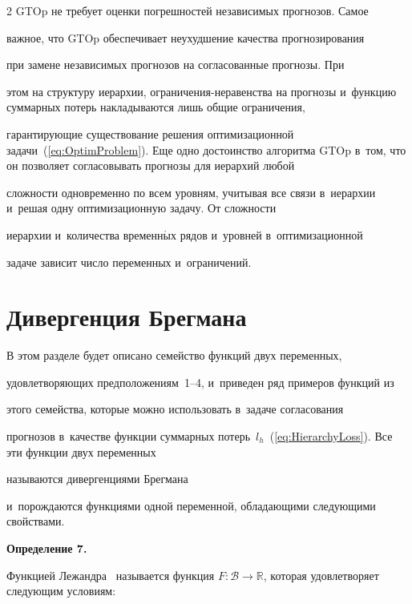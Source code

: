 \begin{multicols}{2}
GTOp не требует оценки погрешностей независимых прогнозов. Самое

важное, что GTOp обеспечивает неухудшение качества прогнозирования

при замене независимых прогнозов на согласованные прогнозы. При

этом на структуру иерархии, огра\-ни\-че\-ния-не\-ра\-вен\-ст\-ва на прогнозы и~функцию суммарных потерь накладываются лишь общие ограничения,

гарантирующие существование решения оптимизационной задачи~(\ref{eq:OptimProblem}). Еще одно достоинство алгоритма GTOp в~том, что он позволяет согласовывать прогнозы для иерархий любой

сложности одновременно по всем уровням, учитывая все связи в~иерархии и~решая одну оптимизационную задачу. От сложности

иерархии и~количества временн$\acute{\mbox{ы}}$х рядов и~уровней в~оптимизационной

задаче зависит число переменных и~ограничений.



\section{Дивергенция Брегмана}



В этом разделе будет описано семейство функций двух переменных,

удовлетворяющих предположениям~1--4, и~приведен ряд примеров функций из

этого семейства, которые можно использовать в~задаче согласования

прогнозов в~качестве функции суммарных потерь~$l_h$~(\ref{eq:HierarchyLoss}). Все эти функции двух переменных

называются дивергенциями Брегмана~\cite{cesa2006prediction, bregman1967relaxation}

и~порождаются функциями одной переменной, обладающими следующими свойствами.



\smallskip



\noindent

\textbf{Определение 7.}


Функцией Лежандра~\cite{cesa2006prediction} называется функция $F

\colon \mathcal{B} \to \mathbb{R}$, которая удовлетворяет следующим условиям:


\end{multicols}
